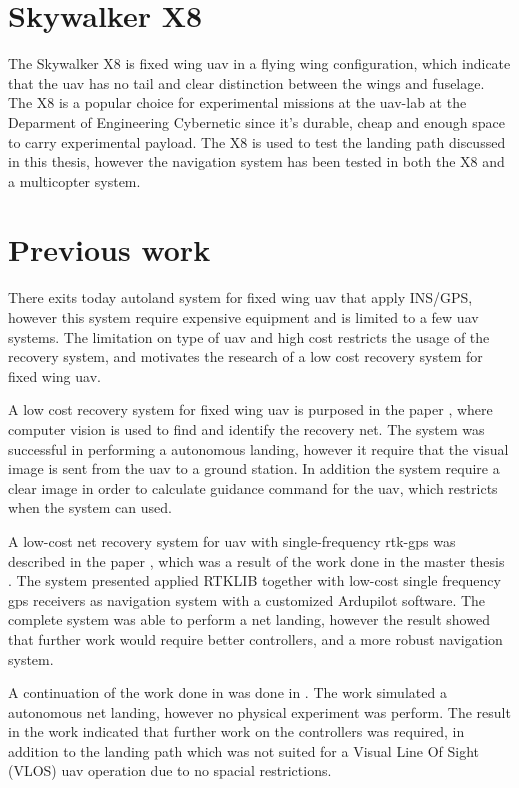 \section{Skywalker X8}
The Skywalker X8 is fixed wing \gls{uav} in a flying wing configuration, which indicate that the \gls{uav} has no tail and clear distinction between the wings and fuselage. The X8 is a popular choice for experimental missions at the \gls{uav}-lab at the Deparment of Engineering Cybernetic since it's durable, cheap and enough space to carry experimental payload. The X8 is used to test the landing path discussed in this thesis, however the navigation system has been tested in both the X8 and a multicopter system.
\section{Previous work}
There exits today autoland system for fixed wing \gls{uav} that apply INS/GPS\citep{SkyHook}, however this system require expensive equipment and is limited to a few \gls{uav} systems. The limitation on type of \gls{uav} and high cost restricts the usage of the recovery system, and motivates the research of a low cost recovery system for fixed wing \gls{uav}.

A low cost recovery system for fixed wing \gls{uav} is purposed in the paper \citep{kim2013fully}, where computer vision is used to find and identify the recovery net. The system was successful in performing a autonomous landing, however it require that the visual image is sent from the \gls{uav} to a ground station. In addition the system require a clear image in order to calculate guidance command for the \gls{uav}, which restricts when the system can used.

A low-cost net recovery system for \gls{uav} with single-frequency \gls{rtk-gps} was described in the paper \citep{skulstad2015net}, which was a result of the work done in the master thesis \citep{Skulstad&Syversen}. The system presented applied RTKLIB together with low-cost single frequency \gls{gps} receivers as navigation system with a customized Ardupilot software. The complete system was able to perform a net landing, however the result showed that further work would require better controllers, and a more robust navigation system.

A continuation of the work done in \citep{Skulstad&Syversen} was done in \citep{Froelich}. The work simulated a autonomous net landing, however no physical experiment was perform. The result in the work indicated that further work on the controllers was required, in addition to the landing path which was not suited for a Visual Line Of Sight  (VLOS) \gls{uav} operation due to no spacial restrictions.
